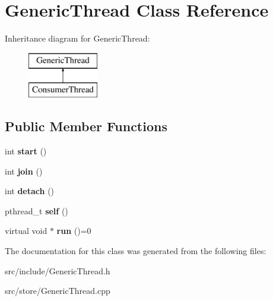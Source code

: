 \hypertarget{classGenericThread}{\section{Generic\-Thread Class Reference}
\label{classGenericThread}
}
Inheritance diagram for Generic\-Thread\-:\begin{figure}[H]
\begin{center}
\leavevmode
\includegraphics[height=2.000000cm]{classGenericThread}
\end{center}
\end{figure}
\subsection*{Public Member Functions}
\begin{DoxyCompactItemize}
\item 
\hypertarget{classGenericThread_ac1d8c3d7dcaae01e89c69093a065141f}{int {\bfseries start} ()}\label{classGenericThread_ac1d8c3d7dcaae01e89c69093a065141f}

\item 
\hypertarget{classGenericThread_a217ef41077ae00ce48372c03838af96a}{int {\bfseries join} ()}\label{classGenericThread_a217ef41077ae00ce48372c03838af96a}

\item 
\hypertarget{classGenericThread_abd0849015ec4004b789aa3181853fbf6}{int {\bfseries detach} ()}\label{classGenericThread_abd0849015ec4004b789aa3181853fbf6}

\item 
\hypertarget{classGenericThread_a0ac1c8aa0c6f5d47d73626c13854d444}{pthread\-\_\-t {\bfseries self} ()}\label{classGenericThread_a0ac1c8aa0c6f5d47d73626c13854d444}

\item 
\hypertarget{classGenericThread_a54147ff9f16e7985e634b5f0d6d5b7f9}{virtual void $\ast$ {\bfseries run} ()=0}\label{classGenericThread_a54147ff9f16e7985e634b5f0d6d5b7f9}

\end{DoxyCompactItemize}


The documentation for this class was generated from the following files\-:\begin{DoxyCompactItemize}
\item 
src/include/Generic\-Thread.\-h\item 
src/store/Generic\-Thread.\-cpp\end{DoxyCompactItemize}

